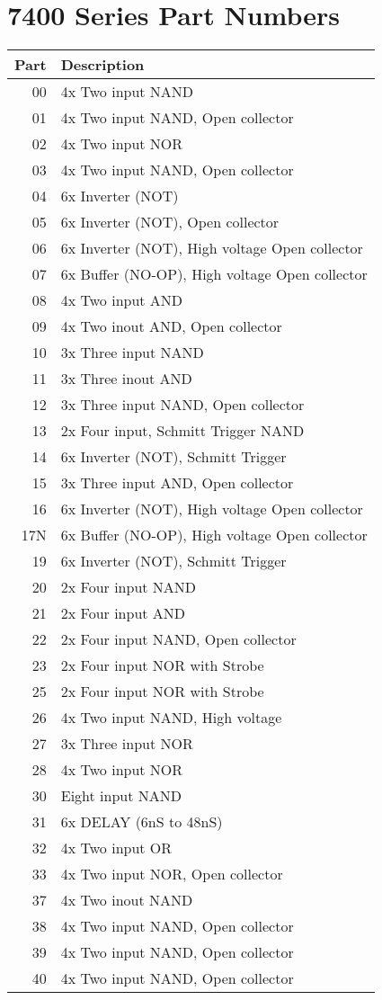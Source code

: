 \chapter{7400 Series Part Numbers}\label{c:7400}
\begin{tabular}{rl}
Part & Description \\\hline
00 & 4x Two input NAND\\
01 & 4x Two input NAND, Open collector\\
02 & 4x Two input NOR\\
03 & 4x Two input NAND, Open collector\\
04 & 6x Inverter (NOT)\\
05 & 6x Inverter (NOT), Open collector\\
06 & 6x Inverter (NOT), High voltage Open collector\\
07 & 6x Buffer (NO-OP), High voltage Open collector\\
08 & 4x Two input AND\\
09 & 4x Two inout AND, Open collector\\
10 & 3x Three input NAND\\
11 & 3x Three inout AND\\
12 & 3x Three input NAND, Open collector\\
13 & 2x Four input, Schmitt Trigger NAND\\
14 & 6x Inverter (NOT), Schmitt Trigger\\
15 & 3x Three input AND, Open collector\\
16 & 6x Inverter (NOT), High voltage Open collector\\
17N & 6x Buffer (NO-OP), High voltage Open collector\\
19 & 6x Inverter (NOT), Schmitt Trigger\\
20 & 2x Four input NAND\\
21 & 2x Four input AND\\
22 & 2x Four input NAND, Open collector\\
23 & 2x Four input NOR with Strobe\\
25 & 2x Four input NOR with Strobe\\
26 & 4x Two input NAND, High voltage\\
27 & 3x Three input NOR\\
28 & 4x Two input NOR\\
30 & Eight input NAND\\
31 & 6x DELAY (6nS to 48nS)\\
32 & 4x Two input OR\\
33 & 4x Two input NOR, Open collector\\
37 & 4x Two inout NAND\\
38 & 4x Two input NAND, Open collector\\
39 & 4x Two input NAND, Open collector\\
40 & 4x Two input NAND, Open collector\\
\end{tabular}

